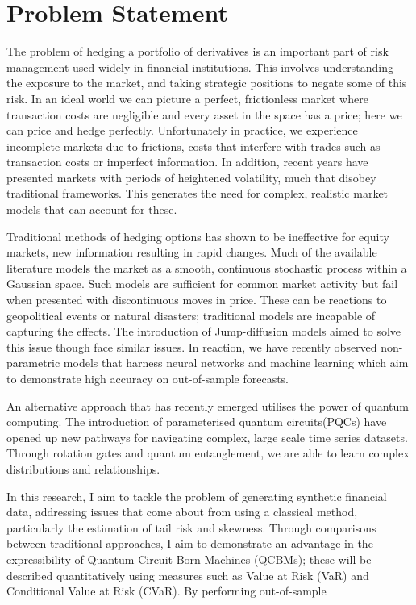 \documentclass[12pt]{article}
\newcommand{\newp}
    {
    \vskip 0.5cm 
  }
\numberwithin{equation}{section}
\begin{document}
\section{Problem Statement}
The problem of hedging a portfolio of derivatives is an important part of 
risk management used widely in financial institutions. This involves understanding 
the exposure to the market, and taking strategic positions to negate some of this 
risk. In an ideal world we can picture a perfect, 
frictionless market where transaction costs are negligible and every asset in 
the space has a price; here we can price and hedge perfectly. Unfortunately in 
practice, we experience incomplete markets due to frictions, costs that interfere 
with trades such as transaction costs or imperfect information. In addition, recent 
years have presented markets with periods of heightened volatility, much that disobey 
traditional frameworks. This generates the need for complex, realistic market 
models that can account for these.
\newp
Traditional methods of hedging options has shown to be ineffective for equity 
markets, new information resulting in rapid changes. Much of the available 
literature models the market as a smooth, continuous stochastic process within 
a Gaussian space. Such models are sufficient for common market activity but fail 
when presented with discontinuous moves in price. These can be reactions to 
geopolitical events or natural disasters; traditional
models are incapable of capturing the effects. The introduction of Jump-diffusion 
models aimed to solve this issue though face similar issues. In reaction, we have 
recently observed non-parametric models that harness neural networks and machine 
learning which aim to demonstrate high accuracy on out-of-sample forecasts.
\newp
An alternative approach that has recently emerged utilises the power of 
quantum computing. The introduction of parameterised quantum circuits(PQCs) have 
opened up new pathways for navigating complex, large scale time series datasets. 
Through rotation gates and quantum entanglement, we are able to learn complex 
distributions and relationships. 
\newp
In this research, I aim to tackle the problem 
of generating synthetic financial data, addressing issues that come about from 
using a classical method, particularly the estimation of tail risk and skewness. 
Through comparisons between traditional approaches, 
I aim to demonstrate an advantage in the expressibility of Quantum Circuit Born 
Machines (QCBMs); these will be described quantitatively using measures such as 
Value at Risk (VaR) and Conditional Value at Risk (CVaR). By performing out-of-sample 
\end{document}

